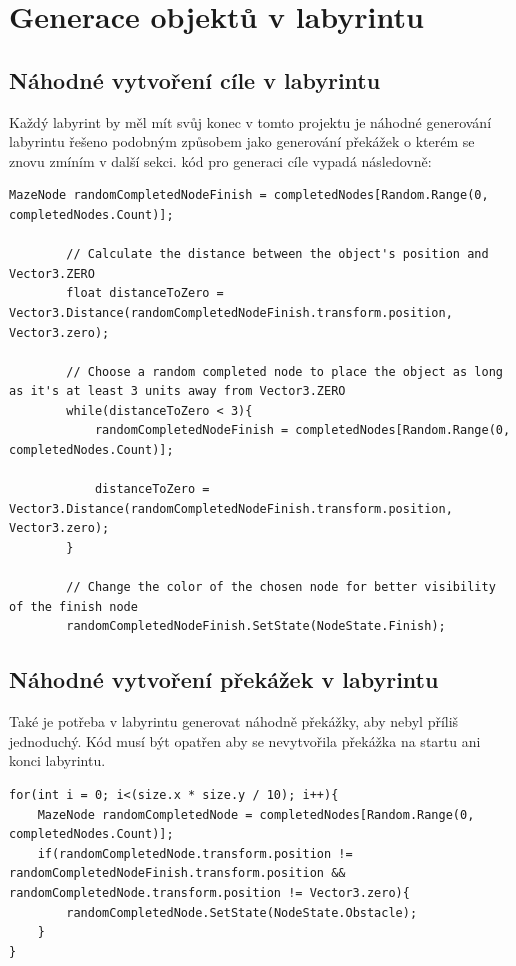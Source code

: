 \documentclass[12pt, a4paper,
twoside        %
]{report}
\let\oldchapter\chapter
\renewcommand{\chapter}{
\clearpage
\pagestyle{plain}
\oldchapter
}
\begin{document}
\chapter{Generace objektů v labyrintu}
\section{Náhodné vytvoření cíle v labyrintu}
Každý labyrint by měl mít svůj konec v tomto projektu je náhodné generování labyrintu řešeno podobným způsobem jako generování překážek o kterém se znovu zmíním v další sekci. kód pro generaci cíle vypadá následovně:

\begin{lstlisting}[language={[Sharp]C}, caption={C\# Vytváření náhodných překážek v labyrintu}, label={Script}]
MazeNode randomCompletedNodeFinish = completedNodes[Random.Range(0, completedNodes.Count)];

        // Calculate the distance between the object's position and Vector3.ZERO
        float distanceToZero = Vector3.Distance(randomCompletedNodeFinish.transform.position, Vector3.zero);

        // Choose a random completed node to place the object as long as it's at least 3 units away from Vector3.ZERO
        while(distanceToZero < 3){
            randomCompletedNodeFinish = completedNodes[Random.Range(0, completedNodes.Count)];

            distanceToZero = Vector3.Distance(randomCompletedNodeFinish.transform.position, Vector3.zero);
        }   

        // Change the color of the chosen node for better visibility of the finish node
        randomCompletedNodeFinish.SetState(NodeState.Finish);
\end{lstlisting}

\vspace{1in}


\section{Náhodné vytvoření překážek v labyrintu}
Také je potřeba v labyrintu generovat náhodně překážky, aby nebyl příliš jednoduchý. Kód musí být opatřen aby se nevytvořila překážka na startu ani konci labyrintu.
\begin{lstlisting}[language={[Sharp]C}, caption={C\# Vytváření náhodných překážek v labyrintu}, label={Script}]
for(int i = 0; i<(size.x * size.y / 10); i++){
    MazeNode randomCompletedNode = completedNodes[Random.Range(0, completedNodes.Count)];
    if(randomCompletedNode.transform.position != randomCompletedNodeFinish.transform.position && randomCompletedNode.transform.position != Vector3.zero){
        randomCompletedNode.SetState(NodeState.Obstacle);
    }
}
\end{lstlisting}
\end{document}
